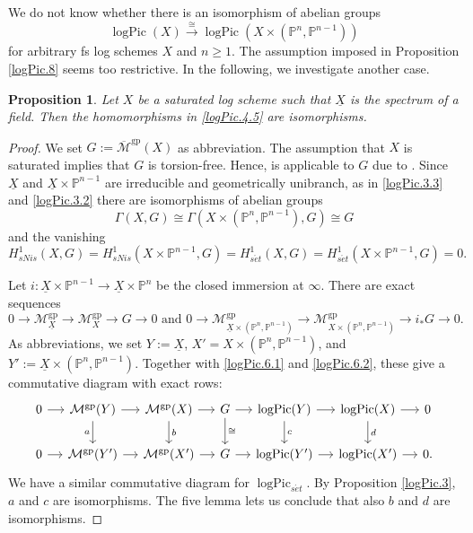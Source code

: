 \documentclass[11pt, a4paper]{amsart}
\newtheorem{prop}[thm]{Proposition}
\theoremstyle{definition}
\numberwithin{equation}{subsection}
\renewcommand{\P}{\mathbb{P}}
\newcommand{\ol}{\overline}
\renewcommand{\ul}{\underline}
\newcommand{\gp}{{\mathrm{gp}}}
\newcommand{\set}{{s\acute{e}t}}
\newcommand{\logPic}{\operatorname{logPic}}
\newcommand{\cM}{\mathcal{M}}
\begin{document}
We do not know whether there is an isomorphism of abelian groups
\[
\logPic(X)
\xrightarrow{\cong}
\logPic(X\times (\P^n,\P^{n-1}))
\]
for arbitrary fs log schemes $X$ and $n\geq 1$.
The assumption imposed in Proposition \ref{logPic.8} seems too restrictive.
In the following, we investigate another case.

\begin{prop}
\label{logPic.6}
Let $X$ be a saturated log scheme such that $\ul{X}$ is the spectrum of a field.
Then the homomorphisms in \eqref{logPic.4.5} are isomorphisms.
\end{prop}
\begin{proof}
We set $G:=\ol{\cM}^{\gp}(X)$ as abbreviation.
The assumption that $X$ is saturated implies that $G$ is torsion-free.
Hence, 
\cite[Proposition XI.3.6(2)]{SGA4} is applicable to $G$ due to \cite[Remarques XI.3.7]{SGA4}.
Since $\ul{X}$ and $\ul{X}\times \P^{n-1}$ are irreducible and geometrically unibranch, as in \eqref{logPic.3.3} and \eqref{logPic.3.2} there are isomorphisms of abelian groups
\begin{equation}
\label{logPic.6.1}
\Gamma(X,G) \cong \Gamma(X\times (\P^n,\P^{n-1}),G)\cong G
\end{equation}
and the vanishing
\begin{equation}
\label{logPic.6.2}
H_{sNis}^1(X,G)
=
H_{sNis}^1(X\times \P^{n-1},G)
=
H_{\set}^1(X,G)
=
H_{\set}^1(X\times \P^{n-1},G)
=
0.
\end{equation}

Let $i\colon \ul{X}\times \P^{n-1}\to \ul{X}\times \P^n$ be the closed immersion at $\infty$.
There are exact sequences
\[
0\to \cM_{\ul{X}}^\gp\to \cM^\gp_{X}\to G \to 0
\text{ and }
0\to \cM_{\ul{X}\times (\P^n,\P^{n-1})}^{\gp}\to \cM^\gp_{X\times (\P^n,\P^{n-1})}\to i_*G \to 0.
\]
As abbreviations, we set $Y:=\ul{X}$, $X'=X\times (\P^n,\P^{n-1})$, and $Y':=\ul{X}\times (\P^n,\P^{n-1})$.
Together with \eqref{logPic.6.1} and \eqref{logPic.6.2}, these give a commutative diagram with exact rows:
\[
\begin{tikzcd}[column sep=small]
0\ar[r]&
\cM^{\gp}(Y)\ar[r]\ar[d,"a"']&
\cM^{\gp}(X)\ar[r]\ar[d,"b"]&
G\ar[r]\ar[d,"\cong"]&
\logPic(Y)\ar[r]\ar[d,"c"]&
\logPic(X)\ar[r]\ar[d,"d"]&
0
\\
0\ar[r]&
\cM^{\gp}(Y')\ar[r]&
\cM^{\gp}(X')\ar[r]&
G\ar[r]&
\logPic(Y')\ar[r]&
\logPic(X')\ar[r]&
0.
\end{tikzcd}
\]
We have a similar commutative diagram for $\logPic_{\set}$.
By Proposition \ref{logPic.3}, $a$ and $c$ are isomorphisms.
The five lemma lets us conclude that also $b$ and $d$ are isomorphisms.
\end{proof}
\end{document}
